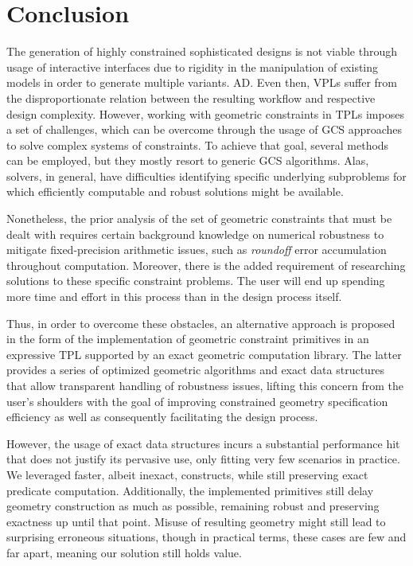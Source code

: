 \section{Conclusion}%
\label{sec:conclusion}

The generation of highly constrained sophisticated designs is not viable through
usage of interactive interfaces due to rigidity in the manipulation of existing
models in order to generate multiple variants.  \Ac{AD}.  Even then, \acp{VPL}
suffer from the disproportionate relation between the resulting workflow and
respective design complexity.  However, working with geometric constraints in
\acp{TPL} imposes a set of challenges, which can be overcome through the usage
of \ac{GCS} approaches to solve complex systems of constraints.  To achieve that
goal, several methods can be employed, but they mostly resort to generic
\acs{GCS} algorithms.  Alas, solvers, in general, have difficulties identifying
specific underlying subproblems for which efficiently computable and robust
solutions might be available.

Nonetheless, the prior analysis of the set of geometric constraints that must be
dealt with requires certain background knowledge on numerical robustness to
mitigate fixed-precision arithmetic issues, such as \textit{roundoff} error
accumulation throughout computation.  Moreover, there is the added requirement
of researching solutions to these specific constraint problems.  The user will
end up spending more time and effort in this process than in the design process
itself.

Thus, in order to overcome these obstacles, an alternative approach is proposed
in the form of the implementation of geometric constraint primitives in an
expressive \ac{TPL} supported by an exact geometric computation library.  The
latter provides a series of optimized geometric algorithms and exact data
structures that allow transparent handling of robustness issues, lifting this
concern from the user's shoulders with the goal of improving constrained
geometry specification efficiency as well as consequently facilitating the
design process.

However, the usage of exact data structures incurs a substantial performance hit
that does not justify its pervasive use, only fitting very few scenarios in
practice.  We leveraged faster, albeit inexact, constructs, while still
preserving exact predicate computation.  Additionally, the implemented
primitives still delay geometry construction as much as possible, remaining
robust and preserving exactness up until that point.  Misuse of resulting
geometry might still lead to surprising erroneous situations, though in
practical terms, these cases are few and far apart, meaning our solution still
holds value.

